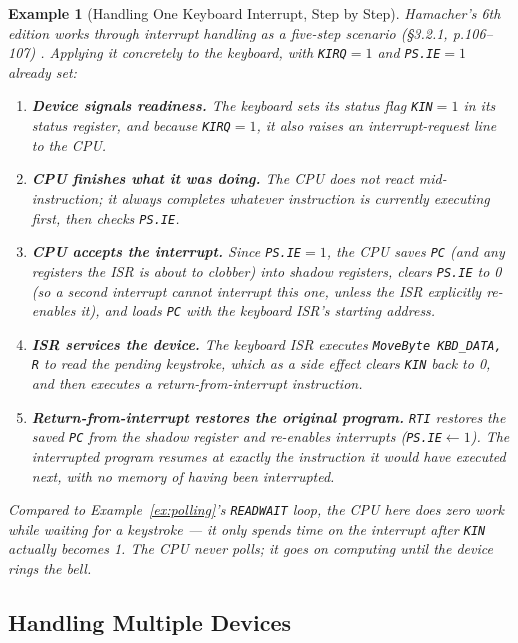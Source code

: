 \documentclass[11pt]{article}
\newtheorem{example}{Example}[section]
\begin{document}
\begin{example}[Handling One Keyboard Interrupt, Step by Step]
\label{ex:5step}
Hamacher's 6th edition works through interrupt handling as a five-step scenario (\S3.2.1, p.106--107) \cite{Hamacher2002_computer_organization}. Applying it concretely to the keyboard, with \texttt{KIRQ}$=1$ and \texttt{PS.IE}$=1$ already set:

\begin{enumerate}
  \item \textbf{Device signals readiness.} The keyboard sets its status flag \texttt{KIN}$=1$ in its status register, and because \texttt{KIRQ}$=1$, it also raises an interrupt-request line to the CPU.
  \item \textbf{CPU finishes what it was doing.} The CPU does not react mid-instruction; it always completes whatever instruction is currently executing first, then checks \texttt{PS.IE}.
  \item \textbf{CPU accepts the interrupt.} Since \texttt{PS.IE}$=1$, the CPU saves \texttt{PC} (and any registers the ISR is about to clobber) into shadow registers, clears \texttt{PS.IE} to 0 (so a second interrupt cannot interrupt this one, unless the ISR explicitly re-enables it), and loads \texttt{PC} with the keyboard ISR's starting address.
  \item \textbf{ISR services the device.} The keyboard ISR executes \texttt{MoveByte KBD\_DATA, R} to read the pending keystroke, which as a side effect clears \texttt{KIN} back to 0, and then executes a return-from-interrupt instruction.
  \item \textbf{Return-from-interrupt restores the original program.} \texttt{RTI} restores the saved \texttt{PC} from the shadow register and re-enables interrupts (\texttt{PS.IE}$\gets1$). The interrupted program resumes at exactly the instruction it would have executed next, with no memory of having been interrupted.
\end{enumerate}
Compared to Example~\ref{ex:polling}'s \texttt{READWAIT} loop, the CPU here does zero work while waiting for a keystroke --- it only spends time on the interrupt \emph{after} \texttt{KIN} actually becomes 1. The CPU never polls; it goes on computing until the device rings the bell.
\end{example}

\subsection{Handling Multiple Devices}
\end{document}
